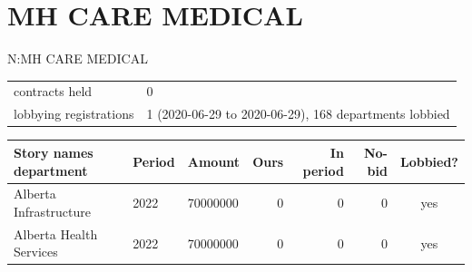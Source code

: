 \documentclass[10pt,a4paper]{article}
\newcommand{\lbl}[1]{{\color{slate}\ttfamily\scriptsize #1}}
\begin{document}
\section*{MH CARE MEDICAL}
\lbl{N:MH CARE MEDICAL}\par
{\small\begin{tabular}{@{}p{3.6cm}p{12.6cm}@{}}
contracts held & 0\\
lobbying registrations & 1 (2020-06-29 to 2020-06-29), 168 departments lobbied\\
\end{tabular}}\par\vspace{0.35em}
{\small\begin{tabular}{@{}p{5.0cm}p{1.5cm}p{1.8cm}rrrc@{}}
\toprule
\textbf{Story names department} & \textbf{Period} & \textbf{Amount} & \textbf{Ours} & \textbf{In period} & \textbf{No-bid} & \textbf{Lobbied?}\\
\midrule
Alberta Infrastructure & 2022 & 70000000 & 0 & 0 & 0 & yes\\
Alberta Health Services & 2022 & 70000000 & 0 & 0 & 0 & yes\\
\bottomrule\end{tabular}}\par
\end{document}

